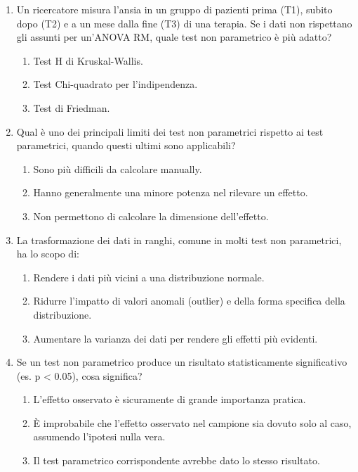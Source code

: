 \documentclass[12pt, a4paper]{article}
\begin{document}
\begin{enumerate}
    \item Un ricercatore misura l'ansia in un gruppo di pazienti prima (T1), subito dopo (T2) e a un mese dalla fine (T3) di una terapia. Se i dati non rispettano gli assunti per un'ANOVA RM, quale test non parametrico è più adatto?
    \begin{enumerate}
        \item Test H di Kruskal-Wallis.
        \item Test Chi-quadrato per l'indipendenza.
        \item Test di Friedman.
    \end{enumerate}
    \vspace{0.5cm}

    \item Qual è uno dei principali limiti dei test non parametrici rispetto ai test parametrici, quando questi ultimi sono applicabili?
    \begin{enumerate}
        \item Sono più difficili da calcolare manually.
        \item Hanno generalmente una minore potenza nel rilevare un effetto.
        \item Non permettono di calcolare la dimensione dell'effetto.
    \end{enumerate}
    \vspace{0.5cm}

    \item La trasformazione dei dati in ranghi, comune in molti test non parametrici, ha lo scopo di:
    \begin{enumerate}
        \item Rendere i dati più vicini a una distribuzione normale.
        \item Ridurre l'impatto di valori anomali (outlier) e della forma specifica della distribuzione.
        \item Aumentare la varianza dei dati per rendere gli effetti più evidenti.
    \end{enumerate}
    \vspace{0.5cm}

    \item Se un test non parametrico produce un risultato statisticamente significativo (es. p < 0.05), cosa significa?
    \begin{enumerate}
        \item L'effetto osservato è sicuramente di grande importanza pratica.
        \item È improbabile che l'effetto osservato nel campione sia dovuto solo al caso, assumendo l'ipotesi nulla vera.
        \item Il test parametrico corrispondente avrebbe dato lo stesso risultato.
    \end{enumerate}
    \vspace{0.5cm}


\end{enumerate}
\end{document}
